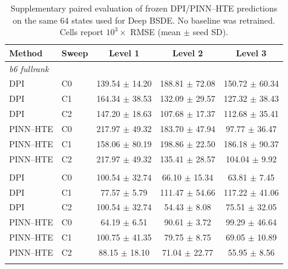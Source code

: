 \documentclass[10pt]{article}
\begin{document}
\begin{table}[t]
\centering\small
\caption{Supplementary paired evaluation of frozen DPI/PINN--HTE predictions on the same 64 states used for Deep BSDE. No baseline was retrained. Cells report $10^3\!\times$ RMSE (mean $\pm$ seed SD).}
\label{tab:matched-existing-64}
\begin{tabular}{llccc}
\toprule
Method & Sweep & Level 1 & Level 2 & Level 3 \\
\midrule
\multicolumn{5}{l}{\emph{b6 fullrank}} \\
DPI & C0 & 139.54 $\pm$ 14.20 & 188.81 $\pm$ 72.08 & 150.72 $\pm$ 60.34 \\
DPI & C1 & 164.34 $\pm$ 38.53 & 132.09 $\pm$ 29.57 & 127.32 $\pm$ 38.43 \\
DPI & C2 & 147.20 $\pm$ 18.63 & 107.68 $\pm$ 17.37 & 112.68 $\pm$ 35.41 \\
PINN--HTE & C0 & 217.97 $\pm$ 49.32 & 183.70 $\pm$ 47.94 & 97.77 $\pm$ 36.47 \\
PINN--HTE & C1 & 158.06 $\pm$ 80.19 & 198.86 $\pm$ 22.50 & 186.18 $\pm$ 90.37 \\
PINN--HTE & C2 & 217.97 $\pm$ 49.32 & 135.41 $\pm$ 28.57 & 104.04 $\pm$ 9.92 \\
\addlinespace
\multicolumn{5}{l}{\emph{dense fourier}} \\
DPI & C0 & 100.54 $\pm$ 32.74 & 66.10 $\pm$ 15.34 & 63.81 $\pm$ 7.45 \\
DPI & C1 & 77.57 $\pm$ 5.79 & 111.47 $\pm$ 54.66 & 117.22 $\pm$ 41.06 \\
DPI & C2 & 100.54 $\pm$ 32.74 & 54.43 $\pm$ 8.08 & 75.51 $\pm$ 32.05 \\
PINN--HTE & C0 & 64.19 $\pm$ 6.51 & 90.61 $\pm$ 3.72 & 99.29 $\pm$ 46.64 \\
PINN--HTE & C1 & 100.75 $\pm$ 41.35 & 79.75 $\pm$ 8.75 & 69.05 $\pm$ 10.89 \\
PINN--HTE & C2 & 88.15 $\pm$ 18.10 & 71.04 $\pm$ 22.77 & 55.95 $\pm$ 8.56 \\
\addlinespace
\bottomrule
\end{tabular}
\end{table}
\end{document}
